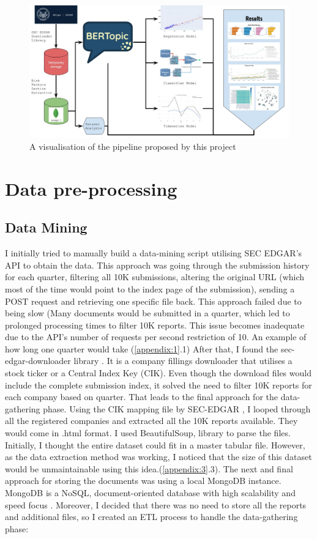 \documentclass[12pt,MSc,a4paper,oneside]{muthesis}
\begin{document}
\begin{figure}[h]
    \centering
    \includegraphics[scale=0.25]{images/Thesis pipeline.jpg}
    \caption{A visualisation of the pipeline proposed by this project}
\end{figure}

\section{Data pre-processing}

\subsection{Data Mining}

I initially tried to manually build a data-mining script utilising SEC EDGAR's API to obtain the data. This approach was going through the submission history for each quarter, filtering all 10K submissions, altering the original URL (which most of the time would point to the index page of the submission), sending a POST request and retrieving one specific file back. This approach failed due to being slow (Many documents would be submitted in a quarter, which led to prolonged processing times to filter 10K reports. This issue becomes inadequate due to the API's number of requests per second restriction of 10. An example of how long one quarter would take (\ref{appendix:1}.1)
After that, I found the sec-edgar-downloader library \cite{sec-edgar-downloader}. It is a company fillings downloader that utilises a stock ticker or a Central Index Key (CIK). Even though the download files would include the complete submission index, it solved the need to filter 10K reports for each company based on quarter. That leads to the final approach for the data-gathering phase. Using the CIK mapping file by SEC-EDGAR \cite{sec-company-tickers}, I looped through all the registered companies and extracted all the 10K reports available. They would come in .html format. I used BeautifulSoup,\cite{bs4} library to parse the files. Initially, I thought the entire dataset could fit in a master tabular file. However, as the data extraction method was working, I noticed that the size of this dataset would be unmaintainable using this idea.(\ref{appendix:3}.3). The next and final approach for storing the documents was using a local MongoDB instance. MongoDB is a NoSQL, document-oriented database with high scalability and speed focus \cite{mongodb}. Moreover, I decided that there was no need to store all the reports and additional files, so I created an ETL process \cite{etl} to handle the data-gathering phase:
\end{document}
